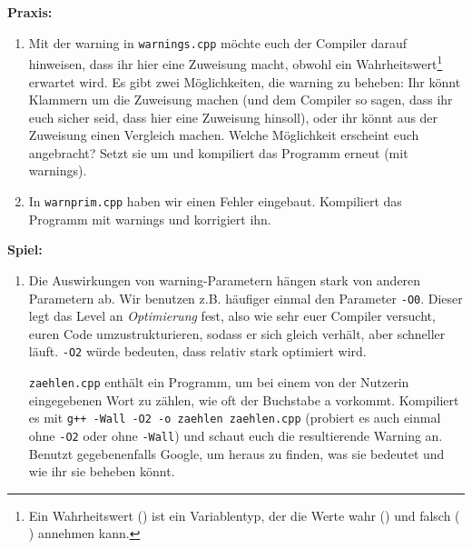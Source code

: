 \textbf{Praxis:}
\begin{enumerate}[resume]
    \item Mit der warning in \texttt{warnings.cpp} möchte euch der Compiler
          darauf hinweisen, dass ihr hier eine Zuweisung macht, obwohl ein
          Wahrheitswert\footnote{Ein Wahrheitswert () ist ein
              Variablentyp, der die Werte wahr () und falsch (
              ) annehmen kann.}
          erwartet wird. Es gibt zwei Möglichkeiten, die warning zu
          beheben: Ihr könnt Klammern um die Zuweisung machen (und dem Compiler
          so sagen, dass ihr euch sicher seid, dass hier eine Zuweisung hinsoll),
          oder ihr könnt aus der Zuweisung einen Vergleich machen. Welche
          Möglichkeit erscheint euch angebracht? Setzt sie um und kompiliert das
          Programm erneut (mit warnings).
    \item In \texttt{warnprim.cpp} haben wir einen Fehler eingebaut. Kompiliert
          das Programm mit warnings und korrigiert ihn.
\end{enumerate}


\textbf{Spiel:}
\begin{enumerate}
    \item Die Auswirkungen von warning-Parametern hängen stark von anderen
          Parametern ab. Wir benutzen z.B. häufiger einmal den Parameter
          \texttt{-O0}. Dieser legt das Level an \emph{Optimierung} fest, also
          wie sehr euer Compiler versucht, euren Code umzustrukturieren, sodass
          er sich gleich verhält, aber schneller läuft. \texttt{-O2} würde
          bedeuten, dass relativ stark optimiert wird.

          \texttt{zaehlen.cpp} enthält ein Programm, um bei einem von der Nutzerin eingegebenen Wort zu zählen, wie oft der Buchstabe a vorkommt.
          Kompiliert es mit \texttt{g++ -Wall -O2 -o zaehlen zaehlen.cpp} (probiert es auch einmal ohne \texttt{-O2} oder ohne \texttt{-Wall}) und schaut euch die resultierende Warning an.
          Benutzt gegebenenfalls Google, um heraus zu finden, was sie bedeutet und wie ihr sie beheben könnt.
\end{enumerate}

